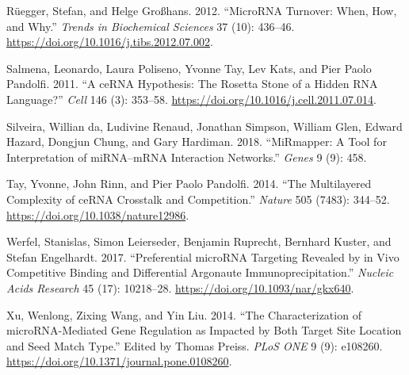 \documentclass[a4,center,fleqn]{NAR}
\begin{document}
\leavevmode\hypertarget{ref-ruegger_microrna_2012}{}%
Rüegger, Stefan, and Helge Großhans. 2012. ``MicroRNA Turnover: When,
How, and Why.'' \emph{Trends in Biochemical Sciences} 37 (10): 436--46.
\url{https://doi.org/10.1016/j.tibs.2012.07.002}.

\leavevmode\hypertarget{ref-salmena_cerna_2011}{}%
Salmena, Leonardo, Laura Poliseno, Yvonne Tay, Lev Kats, and Pier Paolo
Pandolfi. 2011. ``A ceRNA Hypothesis: The Rosetta Stone of a Hidden RNA
Language?'' \emph{Cell} 146 (3): 353--58.
\url{https://doi.org/10.1016/j.cell.2011.07.014}.

\leavevmode\hypertarget{ref-da2018mirmapper}{}%
Silveira, Willian da, Ludivine Renaud, Jonathan Simpson, William Glen,
Edward Hazard, Dongjun Chung, and Gary Hardiman. 2018. ``MiRmapper: A
Tool for Interpretation of miRNA--mRNA Interaction Networks.''
\emph{Genes} 9 (9): 458.

\leavevmode\hypertarget{ref-tay_multilayered_2014}{}%
Tay, Yvonne, John Rinn, and Pier Paolo Pandolfi. 2014. ``The
Multilayered Complexity of ceRNA Crosstalk and Competition.''
\emph{Nature} 505 (7483): 344--52.
\url{https://doi.org/10.1038/nature12986}.

\leavevmode\hypertarget{ref-werfel_preferential_2017}{}%
Werfel, Stanislas, Simon Leierseder, Benjamin Ruprecht, Bernhard Kuster,
and Stefan Engelhardt. 2017. ``Preferential microRNA Targeting Revealed
by in Vivo Competitive Binding and Differential Argonaute
Immunoprecipitation.'' \emph{Nucleic Acids Research} 45 (17): 10218--28.
\url{https://doi.org/10.1093/nar/gkx640}.

\leavevmode\hypertarget{ref-xu_characterization_2014}{}%
Xu, Wenlong, Zixing Wang, and Yin Liu. 2014. ``The Characterization of
microRNA-Mediated Gene Regulation as Impacted by Both Target Site
Location and Seed Match Type.'' Edited by Thomas Preiss. \emph{PLoS ONE}
9 (9): e108260. \url{https://doi.org/10.1371/journal.pone.0108260}.
\end{document}
